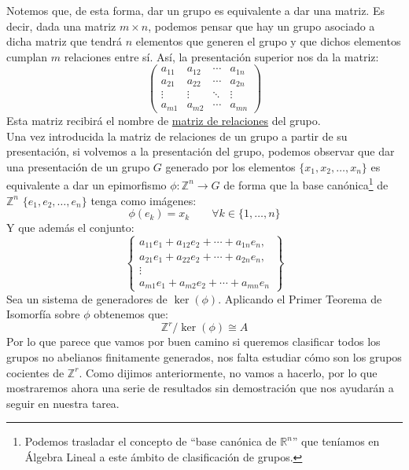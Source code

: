 Notemos que, de esta forma, dar un grupo es equivalente a dar una matriz. Es decir, dada una matriz $m\times n$, podemos pensar que hay un grupo asociado a dicha matriz que tendrá $n$ elementos que generen el grupo y que dichos elementos cumplan $m$ relaciones entre sí. Así, la presentación superior nos da la matriz:
\begin{equation*}
    \left(\begin{array}{cccc}
        a_{11} & a_{12} & \cdots & a_{1n} \\
        a_{21} & a_{22} & \cdots & a_{2n} \\
        \vdots & \vdots & \ddots & \vdots \\
        a_{m1} & a_{m2} & \cdots & a_{mn} 
    \end{array}\right)
\end{equation*}
Esta matriz recibirá el nombre de \underline{matriz de relaciones} del grupo.\\

\noindent
Una vez introducida la matriz de relaciones de un grupo a partir de su presentación, si volvemos a la presentación del grupo, podemos observar que dar una presentación de un grupo $G$ generado por los elementos $\{x_1,x_2,\ldots,x_n\}$ es equivalente a dar un epimorfismo $\phi: \mathbb{Z}^n \to G$ de forma que la base canónica\footnote{Podemos trasladar el concepto de ``base canónica de $\mathbb{R}^n$'' que teníamos en Álgebra Lineal a este ámbito de clasificación de grupos.} de $\mathbb{Z}^n$ $\{e_1,e_2,\ldots, e_n\}$ tenga como imágenes:
\begin{equation*}
    \phi(e_k) = x_k \qquad \forall k\in \{1,\ldots,n\}
\end{equation*}
Y que además el conjunto:
\begin{equation*}
    \left\{\begin{array}{c}
        a_{11}e_1+a_{12}e_2 + \cdots + a_{1n}e_n,\\
        a_{21}e_1 + a_{22}e_2+\cdots+a_{2n}e_n, \\ 
        \vdots\\
        a_{m1}e_1+a_{m2}e_2 + \cdots + a_{mn}e_n
    \end{array}\right\}
\end{equation*}
Sea un sistema de generadores de $\ker(\phi)$. Aplicando el Primer Teorema de Isomorfía sobre $\phi$ obtenemos que:
\begin{equation*}
    \mathbb{Z}^r/\ker(\phi) \cong A
\end{equation*}
Por lo que parece que vamos por buen camino si queremos clasificar todos los grupos no abelianos finitamente generados, nos falta estudiar cómo son los grupos cocientes de $\mathbb{Z}^r$. Como dijimos anteriormente, no vamos a hacerlo, por lo que mostraremos ahora una serie de resultados sin demostración que nos ayudarán a seguir en nuestra tarea.\\

